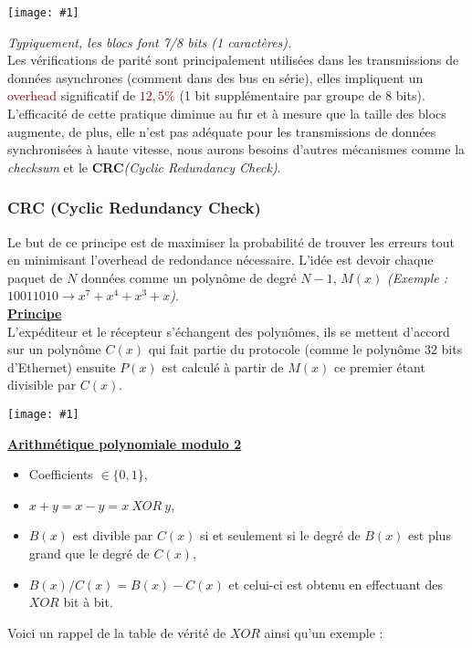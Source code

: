 \documentclass{article}
\newcommand{\red}[1]{\textcolor{darkred}{#1}}
\newcommand{\imgR}[2]{\begin{center}\texttt{[image: \#1]}\end{center}}
\newcommand{\imgRT}[2]{\begin{center}\texttt{[image: \#1]}\end{center}}
\newcommand{\stitre}[1]{\noindent\textbf{\underline{#1}} \\}
\begin{document}
\imgRT{CN_105.png}{200}

\textit{Typiquement, les blocs font 7/8 bits (1 caractères).}\\
\newpage
\noindent Les vérifications de parité sont principalement utilisées dans les transmissions de données asynchrones 
(comment dans des bus en série), elles impliquent un \red{overhead} significatif de \red{$12,5\%$} (1 bit 
supplémentaire par groupe de 8 bits). L'efficacité de cette pratique diminue au fur et à mesure que la taille
des blocs augmente, de plus, elle n'est pas adéquate pour les transmissions de données synchronisées à haute 
vitesse, nous aurons besoins d'autres mécanismes comme la \textit{checksum} et le \textbf{CRC}\textit{(Cyclic 
Redundancy Check)}. \\

\subsubsection{CRC (Cyclic Redundancy Check)}

Le but de ce principe est de maximiser la probabilité de trouver les erreurs tout en minimisant l'overhead de 
redondance nécessaire. L'idée est devoir chaque paquet de $N$ données comme un polynôme de degré $N-1$, $M(x)$
\textit{(Exemple : $10011010 \rightarrow x^7+x^4+x^3+x$)}. \\

\stitre{Principe}

\noindent L'expéditeur et le récepteur s'échangent des polynômes, ils se mettent d'accord sur un polynôme $C(x)$
qui fait partie du protocole (comme le polynôme 32 bits d'Ethernet) ensuite $P(x)$ est calculé à partir de $M(x)$ 
ce premier étant divisible par $C(x)$.

\imgR{CN_106.png}{200}

\stitre{Arithmétique polynomiale modulo 2}

\noindent \begin{itemize}
\item Coefficients $\in\{0,1\}$,
\item $x+y=x-y=x\ XOR\ y$,
\item $B(x)$ est divible par $C(x)$ si et seulement si le degré de $B(x)$ est plus grand que le degré de $C(x)$, 
\item $B(x)/C(x) = B(x)-C(x)$ et celui-ci est obtenu en effectuant des $XOR$ bit à bit.
\end{itemize}

Voici un rappel de la table de vérité de $XOR$ ainsi qu'un exemple : \\
\end{document}

